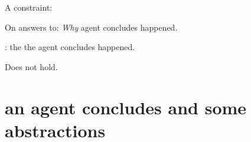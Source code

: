 \documentclass[10pt]{article}
\title{\fc{3}}
\author{Sparkes}
\date{2023/06/13}
\begin{document}
\maketitle

\begin{comment}
  \begin{itemize}
  \item
    Goal for this talk is to cover the foundations of the thesis.
    If things go well, at the end of the presentation you will have a fairly good idea of:
    \begin{enumerate}
    \item
      Broadly, what the thesis is about.
    \item
      What I argued for.
    \item
      The `core' of the argument.

      The thesis is very detail oriented.
      However, most of the thesis amounts to refining a particular idea to obtain a specific result.
      The way the idea is refined is beyond the scope of a presentation like this, but I think the idea itself almost fits.
    \end{enumerate}
  \end{itemize}
\end{comment}


\begin{thesis}
  A constraint:

  \quad On answers to: \emph{Why}    agent concludes happened.

  \quad {}:  the  the agent concludes happened.

  Does not hold.
\end{thesis}

\begin{comment}
  The phrase `an \eiw{0} an agent concludes happens' is carefully chosen.
  It might be more natural to ask why `an agent concludes'.
  However, this suggests something about agency.
  At issue is why the event happened, rather than why the agent concluded.
\end{comment}

\section{ an agent concludes and some abstractions}
\end{document}
